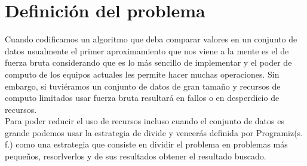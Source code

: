 \section{Definición del problema}
Cuando codificamos un algoritmo que deba comparar valores en un conjunto de datos usualmente el primer aproximamiento que nos viene a la mente es el de fuerza bruta considerando que es lo más sencillo de implementar y el poder de computo de los equipos actuales les permite hacer muchas operaciones. Sin embargo, si tuviéramos un conjunto de datos de gran tamaño y recursos de computo limitados usar fuerza bruta resultará en fallos o en desperdicio de recursos.\\

Para poder reducir el uso de recursos incluso cuando el conjunto de datos es grande podemos usar la estrategia de divide y vencerás definida por Programiz(s. f.) como una estrategia  que consiste en dividir el problema en problemas más pequeños, resorlverlos y de sus resultados obtener el resultado buscado.